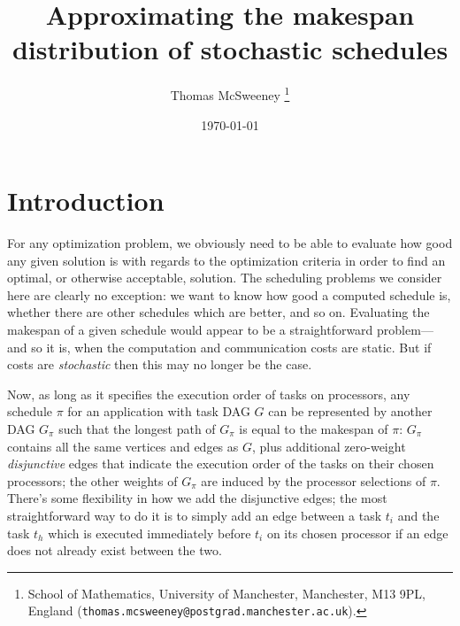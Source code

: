 \documentclass[12pt]{article}
\title{Approximating the makespan distribution of stochastic schedules} %
\author{Thomas McSweeney%
	\thanks{%
		School of Mathematics,
		University of Manchester,
		Manchester, M13 9PL, England
		(\texttt{thomas.mcsweeney@postgrad.manchester.ac.uk}).
	}
}
\date{\today}
\begin{document}
	\maketitle 	


\section{Introduction}
\label{sect.intro}


For any optimization problem, we obviously need to be able to evaluate how good any given solution is with regards to the optimization criteria in order to find an optimal, or otherwise acceptable, solution. The scheduling problems we consider here are clearly no exception: we want to know how good a computed schedule is, whether there are other schedules which are better, and so on. Evaluating the makespan of a given schedule would appear to be a straightforward problem---and so it is, when the computation and communication costs are static. But if costs are {\em stochastic} then this may no longer be the case.

Now, as long as it specifies the execution order of tasks on processors, any schedule $\pi$ for an application with task DAG $G$ can be represented by another DAG $G_{\pi}$ such that the longest path of $G_{\pi}$ is equal to the makespan of $\pi$: $G_\pi$ contains all the same vertices and edges as $G$, plus additional zero-weight {\em disjunctive} edges that indicate the execution order of the tasks on their chosen processors; the other weights of $G_\pi$ are induced by the processor selections of $\pi$. There's some flexibility in how we add the disjunctive edges; the most straightforward way to do it is to simply add an edge between a task $t_i$ and the task $t_h$ which is executed immediately before $t_i$ on its chosen processor if an edge does not already exist between the two.  
\end{document}
